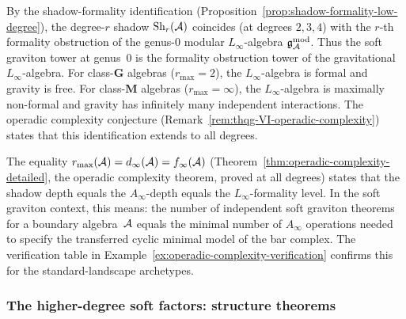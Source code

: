 \begin{remark}
\label{rem:thqg-VI-linfty-formality}
By the shadow-formality identification
(Proposition~\ref{prop:shadow-formality-low-degree}),
the degree-$r$ shadow $\operatorname{Sh}_r(\mathcal{A})$ coincides (at degrees $2,3,4$)
with the $r$-th formality obstruction of the genus-$0$ modular
$L_\infty$-algebra $\mathfrak{g}_{\mathcal{A}}^{\mathrm{mod}}$. Thus the soft graviton tower at
genus~$0$ is the formality obstruction tower of the gravitational
$L_\infty$-algebra. For class-$\mathbf{G}$ algebras
($r_{\max} = 2$), the $L_\infty$-algebra is formal and gravity is
free. For class-$\mathbf{M}$ algebras ($r_{\max} = \infty$), the
$L_\infty$-algebra is maximally non-formal and gravity has
infinitely many independent interactions. The operadic complexity
conjecture (Remark~\ref{rem:thqg-VI-operadic-complexity}) states
that this identification extends to all degrees.
\end{remark}

\begin{remark}
\label{rem:thqg-VI-operadic-complexity}
The equality $r_{\max}(\mathcal{A}) = d_\infty(\mathcal{A}) =
f_\infty(\mathcal{A})$ (Theorem~\ref{thm:operadic-complexity-detailed},
the operadic complexity theorem, proved at all degrees) states
that the shadow depth equals the $A_\infty$-depth equals the
$L_\infty$-formality level. In the
soft graviton context, this means: the number of independent soft
graviton theorems for a boundary algebra~$\mathcal{A}$ equals the
minimal number of $A_\infty$ operations needed to specify the
transferred cyclic minimal model of the bar complex. The
verification table in
Example~\ref{ex:operadic-complexity-verification} confirms this
for the standard-landscape archetypes.
\end{remark}

\subsubsection{The higher-degree soft factors: structure theorems}

